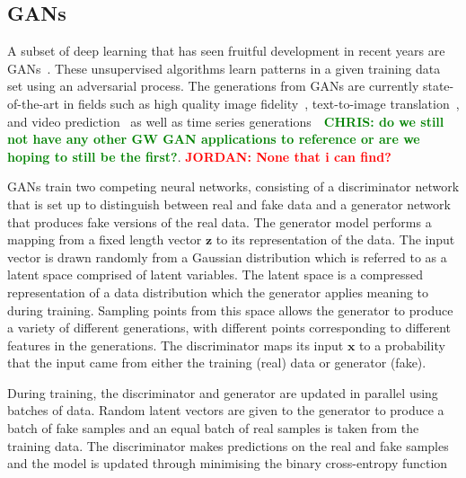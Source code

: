 \documentclass[12pt]{iopart}
\newcommand{\jordan}[1]{\textbf{\textcolor{red}{JORDAN: #1}}}
\newcommand{\chris}[1]{\textbf{\textcolor{green}{CHRIS: #1}}}
\begin{document}
\subsection{GANs}
%
%
A subset of deep learning that has seen fruitful development in recent years
are \acp{GAN}~\cite{Goodfellow2014}. These unsupervised algorithms learn patterns in a
given training data set using an adversarial process. The generations from
\acp{GAN} are currently state-of-the-art in fields such as high quality image
fidelity~\cite{brock2018large,karras2019analyzing}, text-to-image
translation~\cite{reed2016generative}, and video
prediction~\cite{liang2017dual} as well as time series
generations~\cite{esteban2017realvalued}~\chris{do we still not have any other
GW GAN applications to reference or are we hoping to still be the first?}. \jordan{None that i can find?}

%
\acp{GAN} train two competing neural networks, consisting of a discriminator
network that is set up to distinguish between real and fake data and a
generator network that produces fake versions of the real data. The generator model performs a mapping from a fixed length vector $\mathbf{z}$ to its
representation of the data. The input vector is drawn randomly from a Gaussian distribution which is referred to as a latent space comprised of latent variables. The latent space is a compressed representation of a data distribution which the generator applies meaning to during training. Sampling points from this space allows the generator to produce a variety of different generations, with different points corresponding to different features in the generations. The discriminator maps its input $\mathbf{x}$ to a probability that the input came from either the training (real) data or
generator (fake).

%
During training, the discriminator and generator are updated in parallel using batches of data. Random latent vectors are given to the generator to produce a batch of fake samples and an equal batch of real samples is taken from the training data. The discriminator makes predictions on the real and fake samples and the model is updated through minimising the binary cross-entropy function \cite{Goodfellow-et-al-2016}
\end{document}
